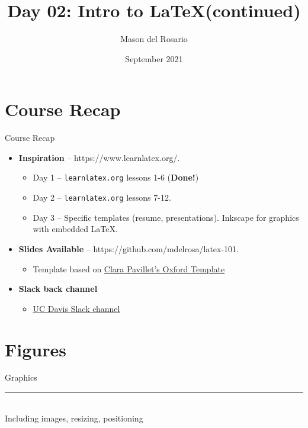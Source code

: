 \documentclass{beamer}
\title{Day 02: Intro to \LaTeX (continued)}
\author{\small{Mason del Rosario}}
\institute{\LaTeX 101}
\date{September 2021} %
\begin{document}
\footnotesize{
% 


{ 
\frame{\titlepage}}

\section{Course Recap}

  \begin{frame}{Course Recap}
    \begin{itemize} 
      \item \textbf{Inspiration} -- https://www.learnlatex.org/. 
        \begin{itemize}
          \item Day 1 -- \texttt{learnlatex.org} lessons 1-6 (\textbf{Done!})
          \item Day 2 -- \texttt{learnlatex.org} lessons 7-12.
          \item Day 3 -- Specific templates (resume, presentations). Inkscape for graphics with embedded \LaTeX.
        \end{itemize}
      \item \textbf{Slides Available} -- https://github.com/mdelrosa/latex-101.
      \begin{itemize}
        \item Template based on \href{https://www.overleaf.com/latex/templates/oxpav/xnjgrxthvjhg}{Clara Pavillet's Oxford Template}
      \end{itemize}
      \item \textbf{Slack back channel}
      \begin{itemize}
        \item \href{https://join.slack.com/share/zt-ul82okyc-SI2GftuwPx_lFyBXll9rjw}{UC Davis Slack channel}
      \end{itemize}
    \end{itemize}
  \end{frame}

  \section{Figures}

  \begin{frame}[plain]
    \vfill
    \centering
    \begin{beamercolorbox}[sep=8pt,center,shadow=true,rounded=true]{Graphics}
      \insertsectionhead\par%
      \color{davisblue}\noindent\rule{10cm}{1pt} \\
      \footnotesize{Including images, resizing, positioning}
    \end{beamercolorbox}
    \vfill
  \end{frame}

}
\end{document}
